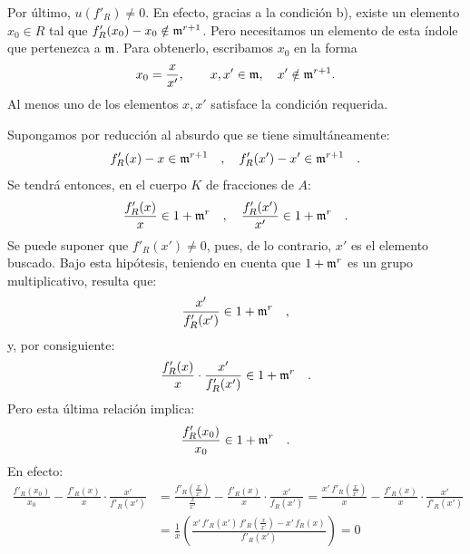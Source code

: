 Por último, $u(f'_R)\ne0$. En efecto, gracias a la condición b), existe un elemento $x_0\in R$ tal que $f'_R(x_0)-x_0\notin\mathfrak m^{r+1}$. Pero necesitamos un elemento de esta índole que pertenezca a $\mathfrak m$. Para obtenerlo, escribamos $x_0$ en la forma
\[
x_0=\frac{x}{x'},\qquad x,x'\in\mathfrak m,\quad x'\notin\mathfrak m^{r+1}.
\]
Al menos uno de los elementos $x,x'$ satisface la condición requerida.

Supongamos por reducción al absurdo que se tiene simultáneamente:
\[
f'_R(x) - x \in \mathfrak m^{r+1} \quad , \quad f'_R(x') - x' \in \mathfrak m^{r+1} \quad .
\]
Se tendrá entonces, en el cuerpo $K$ de fracciones de $A$:%
\[
\frac{f'_R(x)}{x} \in 1 + \mathfrak m^r \quad , \quad \frac{f'_R(x')}{x'} \in 1 + \mathfrak m^r \quad .
\]
Se puede suponer que $f'_R(x') \neq 0$, pues, de lo contrario, $x'$ es el elemento buscado. Bajo esta hipótesis, teniendo en cuenta que $1 + \mathfrak m^r$ es un grupo multiplicativo, resulta que:
\[
\frac{x'}{f'_R(x')} \in 1 + \mathfrak m^r \quad ,
\]
y, por consiguiente:
\[
\frac{f'_R(x)}{x} \cdot \frac{x'}{f'_R(x')} \in 1 + \mathfrak m^r \quad .
\]
Pero esta última relación implica:
\[
\frac{f'_R(x_0)}{x_0} \in 1 + \mathfrak m^r \quad .
\]
En efecto:
\[
\begin{aligned}
\frac{f'_R(x_0)}{x_0} - \frac{f'_R(x)}{x} \cdot \frac{x'}{f'_R(x')}
&= \frac{f'_R(\frac{x}{x'})}{\frac{x}{x'}} - \frac{f'_R(x)}{x} \cdot \frac{x'}{f_R(x')}
= \frac{x'\,f'_R(\frac{x}{x'})}{x} - \frac{f'_R(x)}{x} \cdot \frac{x'}{f'_R(x')} \\
&= \frac{1}{x}\left(\frac{x'\,f'_R(x')\,f'_R(\frac{x}{x'}) - x'\,f_R(x)}{f'_R(x')}\right) = 0
\end{aligned}
\]
